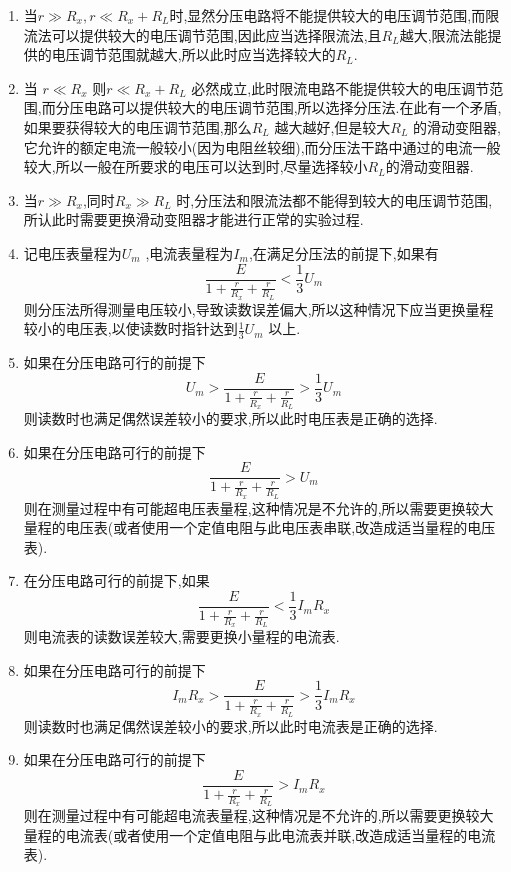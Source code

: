 \begin{enumerate}
  \item   当$r\gg R_x , r \ll R_x+R_L$时,显然分压电路将不能提供较大的电压调节范围,而限流法可以提供较大的电压调节范围,因此应当选择限流法,且$R_L$越大,限流法能提供的电压调节范围就越大,所以此时应当选择较大的$R_L$.
  \item  当 $r\ll R_x$ 则$r\ll R_x+R_L$ 必然成立,此时限流电路不能提供较大的电压调节范围,而分压电路可以提供较大的电压调节范围,所以选择分压法.在此有一个矛盾,如果要获得较大的电压调节范围,那么$R_L$ 越大越好,但是较大$R_L$ 的滑动变阻器,它允许的额定电流一般较小(因为电阻丝较细),而分压法干路中通过的电流一般较大,所以一般在所要求的电压可以达到时,尽量选择较小$R_L$的滑动变阻器.
  \item   当$r\gg R_x$,同时$R_x\gg R_L$ 时,分压法和限流法都不能得到较大的电压调节范围,所认此时需要更换滑动变阻器才能进行正常的实验过程.
  \item  记电压表量程为$U_m$ ,电流表量程为$I_m$,在满足分压法的前提下,如果有
    $$ \frac{E}{1+\frac{r}{R_x}+\frac{r}{R_L} }<\frac{1}{3}U_m $$
    则分压法所得测量电压较小,导致读数误差偏大,所以这种情况下应当更换量程较小的电压表,以使读数时指针达到$\frac{1}{3}U_m$ 以上.
    \item 如果在分压电路可行的前提下
    $$ U_m > \frac{E}{1+\frac{r}{R_x}+\frac{r}{R_L} }>\frac{1}{3}U_m $$
    则读数时也满足偶然误差较小的要求,所以此时电压表是正确的选择.
  \item 如果在分压电路可行的前提下
    $$ \frac{E}{1+\frac{r}{R_x}+\frac{r}{R_L} }>U_m $$
    则在测量过程中有可能超电压表量程,这种情况是不允许的,所以需要更换较大量程的电压表(或者使用一个定值电阻与此电压表串联,改造成适当量程的电压表).
  \item 在分压电路可行的前提下,如果
    $$ \frac{E}{1+\frac{r}{R_x}+\frac{r}{R_L} }<\frac{1}{3}I_m R_x$$
    则电流表的读数误差较大,需要更换小量程的电流表.
    \item 如果在分压电路可行的前提下
    $$ I_mR_x > \frac{E}{1+\frac{r}{R_x}+\frac{r}{R_L} }>\frac{1}{3}I_m R_x$$
    则读数时也满足偶然误差较小的要求,所以此时电流表是正确的选择.
  \item 如果在分压电路可行的前提下
    $$ \frac{E}{1+\frac{r}{R_x}+\frac{r}{R_L} }>I_mR_x $$
    则在测量过程中有可能超电流表量程,这种情况是不允许的,所以需要更换较大量程的电流表(或者使用一个定值电阻与此电流表并联,改造成适当量程的电流表).
\end{enumerate}


